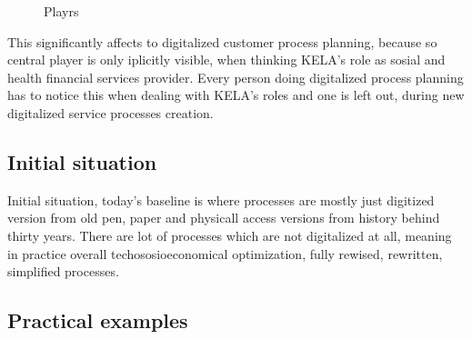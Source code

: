\begin{figure}
 \begin{center}
  \caption{Playrs}
  \label{fig:players} 
 \end{center}
\end{figure}

This significantly affects to digitalized customer process planning,
because so central player is only iplicitly visible,
when thinking KELA's role as sosial and health financial services provider.
Every person doing digitalized process planning has to notice this
when dealing with KELA's roles and one is left out,
during new digitalized service processes creation.

\subsection{Initial situation}
\label{initial_situation}

Initial situation,
today's baseline is where processes are mostly just digitized version from old pen,
paper and physicall access versions from history behind thirty years.
There are lot of processes which are not digitalized at all,
meaning in practice overall techososioeconomical optimization,
fully rewised, rewritten, simplified processes.

\subsection{Practical examples}
\label{practical_examples}

